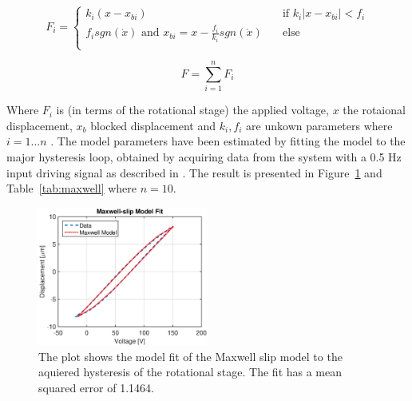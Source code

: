 \begin{equation}
  \label{eq:maxwell_slip}
  F_i =
  \begin{cases}
    k_i(x - x_{bi}) & \quad \text{if }  k_i|x - x_{bi}| < f_i\\
    f_isgn(\dot{x}) \text{ and } x_{bi} = x - \frac{f_i}{k_i}sgn(\dot{x})  & \quad \text{else}\\
  \end{cases}
\end{equation}

\begin{equation}
  \label{eq:maxwell_sum}
  F = \displaystyle\sum_{i=1}^{n} F_i
\end{equation}

Where $F_i$ is (in terms of the rotational stage) the applied voltage, $x$ the rotaional displacement, $x_b$ blocked displacement and $k_i, f_i$ are unkown parameters where $i=1 \hdots n$ . The model parameters have been estimated by fitting the model to the major hysteresis loop, obtained by acquiring data from the system with a 0.5 Hz input driving signal as described in \cite{ButcherIdentification:2015,ButcherController:2015}. The result is presented in Figure~\ref{fig:maxwell} and Table~\ref{tab:maxwell} where $n=10$.

\begin{figure}[h]
  \centering
  \includegraphics[width=0.5\textwidth]{fig/matlab/maxwell.eps}
  \caption{\label{fig:maxwell} The plot shows the model fit of the Maxwell slip model to the aquiered hysteresis of the rotational stage. The fit has a mean squared error of 1.1464.}
\end{figure}

